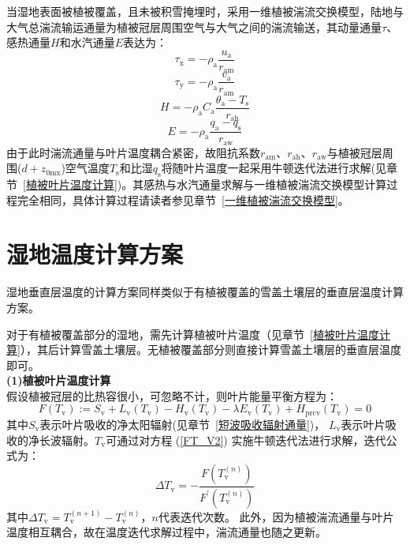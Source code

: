 当湿地表面被植被覆盖，且未被积雪掩埋时，采用一维植被湍流交换模型，陆地与大气总湍流输运通量为植被冠层周围空气与大气之间的湍流输送，其动量通量$\tau$、感热通量$H$和水汽通量$E$表达为：
\begin{equation}
  \tau_{\mathrm{x}}=-\rho_{\mathrm{a}} \frac{u_{\mathrm{a}}}{r_{\mathrm{a m}}}
\end{equation}
\begin{equation}
  \tau_{\mathrm{y}}=-\rho_{\mathrm{a}} \frac{v_{\mathrm{a}}}{r_{\mathrm{a m}}}
\end{equation}
\begin{equation}
  H=-\rho_{\mathrm{a}} C_{\mathrm{a}} \frac{\theta_{\mathrm{a}}-T_{\mathrm{s}}}{r_{\mathrm{a h}}}
\end{equation}
\begin{equation}
  E=-\rho_{\mathrm{a}} \frac{q_{\mathrm{a}}-q_{\mathrm{s}}}{r_{\mathrm{a w}}}
\end{equation}
由于此时湍流通量与叶片温度耦合紧密，故阻抗系数$r_{\mathrm{am}}$、$r_{\mathrm{ah}}$、$r_{\mathrm{aw}}$与植被冠层周围($d+z_{\mathrm{0mx}}$)空气温度$T_{\mathrm {s}} $和比湿$q_{\mathrm {s}} $将随叶片温度一起采用牛顿迭代法进行求解(见章节~\ref{植被叶片温度计算})。其感热与水汽通量求解与一维植被湍流交换模型计算过程完全相同，具体计算过程请读者参见章节~\ref{一维植被湍流交换模型}。

\section{湿地温度计算方案}
湿地垂直层温度的计算方案同样类似于有植被覆盖的雪盖土壤层的垂直层温度计算方案。

对于有植被覆盖部分的湿地，需先计算植被叶片温度（见章节~\ref{植被叶片温度计算}），其后计算雪盖土壤层。无植被覆盖部分则直接计算雪盖土壤层的垂直层温度即可。\\

\textbf {(1)植被叶片温度计算}\\

假设植被冠层的比热容很小，可忽略不计，则叶片能量平衡方程为：
\begin{equation}\label{FT_V2}
  F\left(T_{\mathrm{v}}\right):=S_{\mathrm{v}}+L_{\mathrm{v}}\left(T_{\mathrm{v}}\right)-H_{\mathrm{v}}\left(T_{\mathrm{v}}\right)-\lambda E_{\mathrm{v}}\left(T_{\mathrm{v}}\right)+H_{\mathrm{p r c v}}\left(T_{\mathrm{v}}\right)=0
\end{equation}
其中$S_{\mathrm {v}} $表示叶片吸收的净太阳辐射(见章节~\ref{短波吸收辐射通量})，
$L_{\mathrm {v}} $表示叶片吸收的净长波辐射。$T_{\mathrm {v}} $可通过对方程 (\ref{FT_V2}) 实施牛顿迭代法进行求解，迭代公式为：
\begin{equation}
  \Delta T_{\mathrm{v}}=-\frac{F\left(T_{\mathrm{v}}^{(n)}\right)}{F^{\prime}\left(T_{\mathrm{v}}^{(n)}\right)}
\end{equation}
其中$\Delta T_{\mathrm {v}} =T_{\mathrm {v}} ^{\left(n+1\right)}-T_{\mathrm {v}} ^{\left(n\right)}$，$n$代表迭代次数。
此外，因为植被湍流通量与叶片温度相互耦合，故在温度迭代求解过程中，湍流通量也随之更新。

